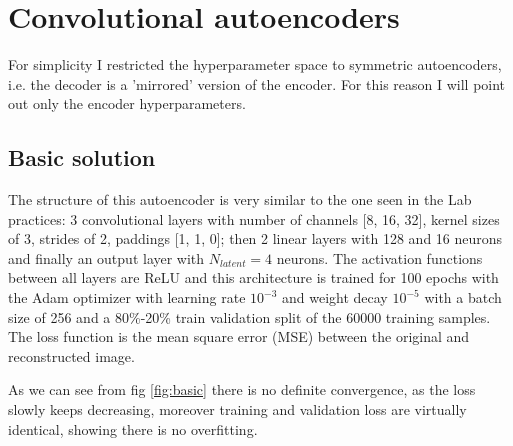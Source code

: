 \documentclass[a4paper, 11pt]{article}
\begin{document}
\section{Convolutional autoencoders}
  For simplicity I restricted the hyperparameter space to symmetric autoencoders, i.e. the decoder is a 'mirrored' version of the encoder. For this reason I will point out only the encoder hyperparameters.
  \subsection{Basic solution}
    The structure of this autoencoder is very similar to the one seen in the Lab practices: 3 convolutional layers with number of channels [8, 16, 32], kernel sizes of 3, strides of 2, paddings [1, 1, 0]; then 2 linear layers with 128 and 16 neurons and finally an output layer with $N_{latent} = 4$ neurons. The activation functions between all layers are ReLU and this architecture is trained for 100 epochs with the Adam optimizer with learning rate $10^{-3}$ and weight decay $10^{-5}$ with a batch size of 256 and a 80\%-20\% train validation split of the 60000 training samples. The loss function is the mean square error (MSE) between the original and reconstructed image.

    As we can see from fig \ref{fig:basic} there is no definite convergence, as the loss slowly keeps decreasing, moreover training and validation loss are virtually identical, showing there is no overfitting.
\end{document}
